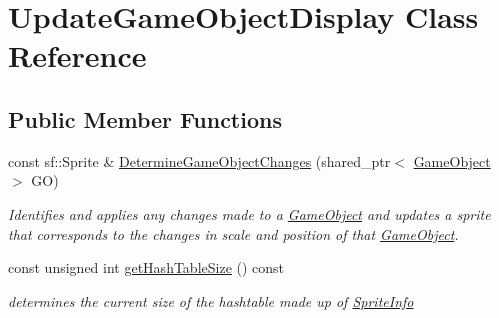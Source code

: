 \hypertarget{class_update_game_object_display}{}\section{Update\+Game\+Object\+Display Class Reference}
\label{class_update_game_object_display}
\subsection*{Public Member Functions}
\begin{DoxyCompactItemize}
\item 
const sf\+::\+Sprite \& \hyperlink{class_update_game_object_display_ac17a26f7563060fb9d4a0eb8959b1d29}{Determine\+Game\+Object\+Changes} (shared\+\_\+ptr$<$ \hyperlink{class_game_object}{Game\+Object} $>$ GO)
\begin{DoxyCompactList}\small\item\em Identifies and applies any changes made to a \hyperlink{class_game_object}{Game\+Object} and updates a sprite that corresponds to the changes in scale and position of that \hyperlink{class_game_object}{Game\+Object}. \end{DoxyCompactList}\item 
const unsigned int \hyperlink{class_update_game_object_display_a84972d99bd8f15ca869fc3710b836283}{get\+Hash\+Table\+Size} () const
\begin{DoxyCompactList}\small\item\em determines the current size of the hashtable made up of \hyperlink{struct_sprite_info}{Sprite\+Info} \end{DoxyCompactList}\end{DoxyCompactItemize}
